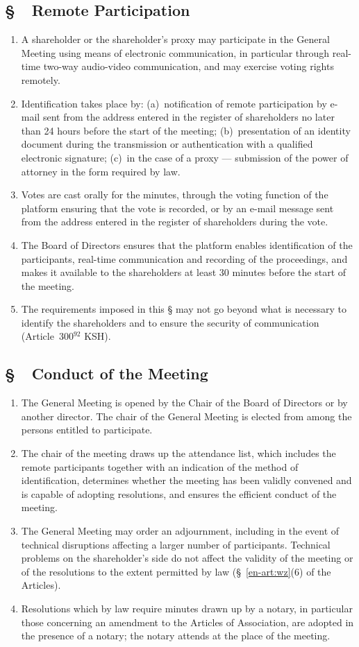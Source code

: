 \documentclass[11pt,a4paper]{report}
\newcounter{paragraf}
\newcommand{\paragraf}[1]{%
  \refstepcounter{paragraf}%
  \Needspace{5\baselineskip}%
  \subsection*{\S~\theparagraf\ #1}%
}
\newenvironment{ContractClause}[1]{\paragraf{#1}}{\par}
\newcommand{\US}[1]{\S~#1 of the Articles}
\begin{document}
\begin{ContractClause}{Remote Participation}
\begin{enumerate}
  \item A shareholder or the shareholder's proxy may participate in the General Meeting using means of electronic communication, in particular through real-time two-way audio-video communication, and may exercise voting rights remotely.
  \item Identification takes place by: (a)~notification of remote participation by e-mail sent from the address entered in the register of shareholders no later than 24 hours before the start of the meeting; (b)~presentation of an identity document during the transmission or authentication with a qualified electronic signature; (c)~in the case of a proxy --- submission of the power of attorney in the form required by law.
  \item Votes are cast orally for the minutes, through the voting function of the platform ensuring that the vote is recorded, or by an e-mail message sent from the address entered in the register of shareholders during the vote.
  \item The Board of Directors ensures that the platform enables identification of the participants, real-time communication and recording of the proceedings, and makes it available to the shareholders at least 30 minutes before the start of the meeting.
  \item The requirements imposed in this \S{} may not go beyond what is necessary to identify the shareholders and to ensure the security of communication (Article~300$^{92}$ KSH).
\end{enumerate}
\end{ContractClause}

\begin{ContractClause}{Conduct of the Meeting}
\begin{enumerate}
  \item The General Meeting is opened by the Chair of the Board of Directors or by another director. The chair of the General Meeting is elected from among the persons entitled to participate.
  \item The chair of the meeting draws up the attendance list, which includes the remote participants together with an indication of the method of identification, determines whether the meeting has been validly convened and is capable of adopting resolutions, and ensures the efficient conduct of the meeting.
  \item The General Meeting may order an adjournment, including in the event of technical disruptions affecting a larger number of participants. Technical problems on the shareholder's side do not affect the validity of the meeting or of the resolutions to the extent permitted by law (\US{\ref{en-art:wz}(6)}).
  \item Resolutions which by law require minutes drawn up by a notary, in particular those concerning an amendment to the Articles of Association, are adopted in the presence of a notary; the notary attends at the place of the meeting.
\end{enumerate}
\end{ContractClause}
\end{document}
